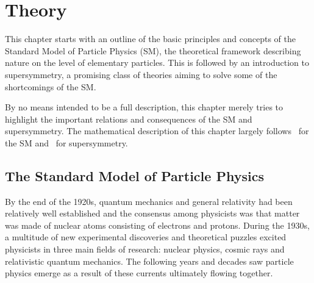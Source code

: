 
\chapter{Theory}

\ifpdf
    \graphicspath{{chapter-theory/Figs/Raster/}{chapter-theory/Figs/PDF/}{chapter-theory/Figs/}}
\else
    \graphicspath{{chapter-theory/Figs/Vector/}{chapter-theory/Figs/}}
\fi

This chapter starts with an outline of the basic principles and concepts of the Standard Model of Particle Physics (SM), the theoretical framework describing nature on the level of elementary particles. This is followed by an introduction to supersymmetry, a promising class of theories aiming to solve some of the shortcomings of the SM.

By no means intended to be a full description, this chapter merely tries to highlight the important relations and consequences of the SM and supersymmetry. The mathematical description of this chapter largely follows~\cite{Peskin:1995ev} for the SM and~\cite{Martin:1997ns} for supersymmetry.

\section{The Standard Model of Particle Physics}


By the end of the 1920s, quantum mechanics and general relativity had been relatively well established and the consensus among physicists was that matter was made of nuclear atoms consisting of electrons and protons. During the 1930s, a multitude of new experimental discoveries and theoretical puzzles excited physicists in three main fields of research: nuclear physics, cosmic rays and relativistic quantum mechanics. The following years and decades saw particle physics emerge as a result of these currents ultimately flowing together.

